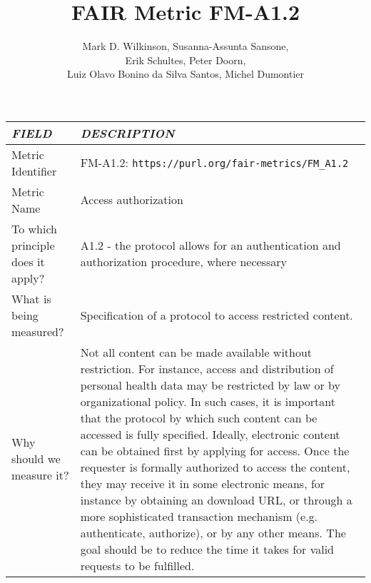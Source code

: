 \documentclass[english]{article}
\begin{document}
\title{FAIR Metric FM-A1.2}

\author{Mark D. Wilkinson, Susanna-Assunta Sansone, \\Erik Schultes, Peter Doorn,\\ 
Luiz Olavo Bonino da Silva Santos, Michel Dumontier}

\maketitle

\newpage





\begin{longtable}{|p{5cm}|p{9cm}|}


\hline
\emph{FIELD} & \emph{DESCRIPTION} \\
\hline
Metric Identifier &   FM-A1.2: \verb"https://purl.org/fair-metrics/FM_A1.2"
 \\


\hline
Metric Name &   



Access authorization



 \\



\hline
To which principle does it apply? &   


A1.2 - the protocol allows for an authentication and authorization procedure, where necessary

\\



\hline
What is being measured? & 

Specification of a protocol to access restricted content.


\\



\hline
Why should we measure it? & 


Not all content can be made available without restriction. For instance, access and distribution of personal health data may be restricted by law or by organizational policy. In such cases, it is important that the protocol by which such content can be accessed is fully specified. Ideally, electronic content can be obtained first by applying for access. Once the requester is formally authorized to access the content, they may receive it in some electronic means, for instance by obtaining an download URL, or through a more sophisticated transaction mechanism (e.g. authenticate, authorize), or by any other means. The goal should be to reduce the time it takes for valid requests to be fulfilled. 
  

\end{longtable}
\end{document}
